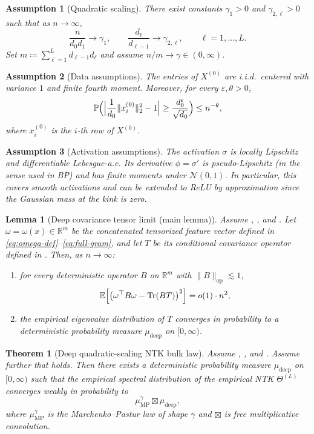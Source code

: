 \documentclass[11pt]{article}
\newcommand{\RR}{\mathbb{R}}
\newcommand{\EE}{\mathbb{E}}
\newcommand{\PP}{\mathbb{P}}
\newcommand{\tr}{\mathrm{Tr}}
\newtheorem{theorem}{Theorem}
\newtheorem{lemma}{Lemma}
\newtheorem{assumption}{Assumption}
\begin{document}
\begin{assumption}[Quadratic scaling]\label{ass:scaling}
There exist constants $\gamma_1>0$ and $\gamma_{2,\ell}>0$ such that as $n\to\infty$,
\[
  \frac{n}{d_0d_1}\to \gamma_1,
  \qquad
  \frac{d_\ell}{d_{\ell-1}}\to \gamma_{2,\ell},
  \qquad \ell=1,\dots,L.
\]
Set $m\coloneqq \sum_{\ell=1}^L d_{\ell-1}d_\ell$ and assume $n/m\to \gamma\in(0,\infty)$.
\end{assumption}

\begin{assumption}[Data assumptions]\label{ass:data}
The entries of $X^{(0)}$ are i.i.d.\ centered with variance $1$ and finite fourth moment.
Moreover, for every $\varepsilon,\theta>0$,
\[
  \PP\Bigl(\Bigl|\frac{1}{d_0}\|x_i^{(0)}\|_2^2-1\Bigr|\geq \frac{d_0^\varepsilon}{\sqrt{d_0}}\Bigr)\leq n^{-\theta},
\]
where $x_i^{(0)}$ is the $i$-th row of $X^{(0)}$.
\end{assumption}

\begin{assumption}[Activation assumptions]\label{ass:activation}
The activation $\sigma$ is locally Lipschitz and differentiable Lebesgue-a.e.
Its derivative $\phi=\sigma'$ is pseudo-Lipschitz (in the sense used in BP) and has finite moments under $\mathcal{N}(0,1)$.
In particular, this covers smooth activations and can be extended to ReLU by approximation since the Gaussian mass at the kink is zero.
\end{assumption}

\begin{lemma}[Deep covariance tensor limit (main lemma)]\label{lem:deep-gep}
Assume , , and .
Let $\omega=\omega(x)\in\RR^m$ be the concatenated tensorized feature vector defined in \eqref{eq:omega-def}--\eqref{eq:full-gram}, and let $T$ be its conditional covariance operator defined in .
Then, as $n\to\infty$:
\begin{enumerate}
  \item for every deterministic operator $B$ on $\RR^m$ with $\|B\|_{\mathrm{op}}\lesssim 1$,
  \[
    \EE\Bigl[\bigl(\omega^\top B\omega-\tr(BT)\bigr)^2\Bigr]=o(1)\cdot n^2,
  \]
  \item the empirical eigenvalue distribution of $T$ converges in probability to a deterministic probability measure $\mu_{\mathrm{deep}}$ on $[0,\infty)$.
\end{enumerate}
\end{lemma}

\begin{theorem}[Deep quadratic-scaling NTK bulk law]\label{thm:deep-main}
Assume , , and .
Assume further that  holds.
Then there exists a deterministic probability measure $\mu_{\mathrm{deep}}$ on $[0,\infty)$ such that the empirical spectral distribution of the empirical NTK $\Theta^{(L)}$ converges weakly in probability to
\[
  \mu_{\mathrm{MP}}^{\gamma}\boxtimes \mu_{\mathrm{deep}},
\]
where $\mu_{\mathrm{MP}}^{\gamma}$ is the Marchenko--Pastur law of shape $\gamma$ and $\boxtimes$ is free multiplicative convolution.
\end{theorem}
\end{document}
